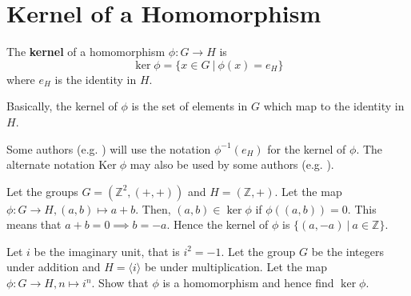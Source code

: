 \section{Kernel of a Homomorphism}
\begin{definition}
    The \textbf{kernel} of a homomorphism $\phi: G \to H$ is
    \[
        \ker\phi = \{x \in G \ | \ \phi(x) = e_H\}
    \]
    where $e_H$ is the identity in $H$.
\end{definition}
Basically, the kernel of $\phi$ is the set of elements in $G$ which map to the identity in $H$.

\begin{remark}
    Some authors (e.g. \cite{libretexts_imandker}) will use the notation $\phi^{-1}(e_H)$ for the kernel of $\phi$. The alternate notation $\mathrm{Ker}\;\phi$ may also be used by some authors (e.g. \cite{clark_1984, hungerford_1980}).
\end{remark}

\begin{example}
    Let the groups $G = (\mathbb{Z}^2, (+, +))$ and $H = (\mathbb{Z}, +)$. Let the map $\phi: G \to H, (a, b) \mapsto a+b$. Then, $(a, b) \in \ker\phi$ if $\phi((a,b)) = 0$. This means that $a+b = 0 \implies b = -a$. Hence the kernel of $\phi$ is $\{(a, -a) \ | \ a \in \mathbb{Z}\}$.
\end{example}

\begin{exercise}
    Let $i$ be the imaginary unit, that is $i^2 = -1$. Let the group $G$ be the integers under addition and $H = \langle i \rangle$ be under multiplication. Let the map $\phi: G \to H, n \mapsto i^n$.  Show that $\phi$ is a homomorphism and hence find $\ker\phi$.
\end{exercise}

\newpage

